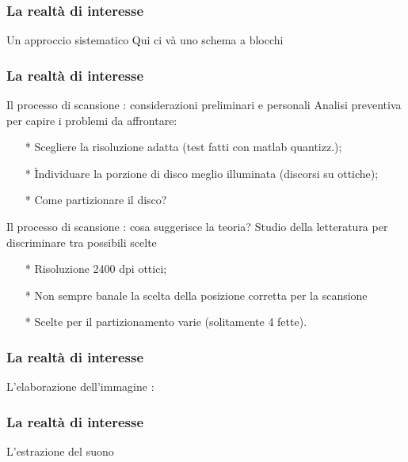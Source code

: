 \begin{frame}
\frametitle{La realtà di interesse}
\begin{block}{Un approccio sistematico}
Qui ci và uno schema a blocchi 
\end{block}
\end{frame}

\begin{frame}
\frametitle{La realtà di interesse}
\begin{block}{Il processo di scansione : considerazioni preliminari e personali}
Analisi preventiva per capire i problemi da affrontare:
\begin{itemize}
\item[*] Scegliere la risoluzione adatta (test fatti con matlab quantizz.);
\item[*] \`Individuare la porzione di disco meglio illuminata (discorsi su ottiche);
\item[*] Come partizionare il disco?
\end{itemize}
\end{block}

\begin{block}{Il processo di scansione : cosa suggerisce la teoria?}
Studio della letteratura per discriminare tra possibili scelte 
\begin{itemize}
\item[*] Risoluzione 2400 dpi ottici;
\item[*] Non sempre banale la scelta della posizione corretta per la scansione
\item[*] Scelte per il partizionamento varie (solitamente 4 fette).
\end{itemize}
\end{block}
\end{frame}

\begin{frame}
\frametitle{La realtà di interesse}
\begin{block}{L'elaborazione dell'immagine : }

\end{block}
\end{frame}

\begin{frame}
\frametitle{La realtà di interesse}
\begin{block}{L'estrazione del suono}

\end{block}
\end{frame}
